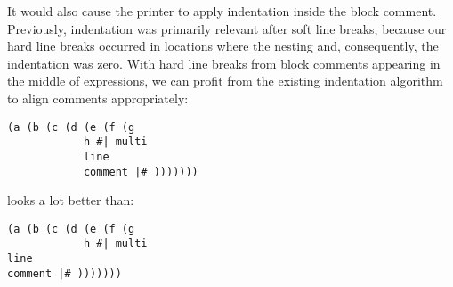 It would also cause the printer to apply indentation inside the block comment.
Previously, indentation was primarily relevant after soft line breaks,
because our hard line breaks occurred in locations where the nesting and,
consequently, the indentation was zero.
With hard line breaks from block comments appearing in the middle of expressions,
we can profit from the existing indentation algorithm to align comments appropriately:
\begin{verbatim}
(a (b (c (d (e (f (g
            h #| multi
            line
            comment |# )))))))
\end{verbatim}
looks a lot better than:
\begin{verbatim}
(a (b (c (d (e (f (g
            h #| multi
line
comment |# )))))))
\end{verbatim}


